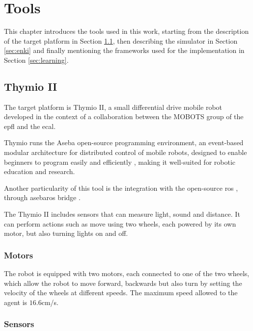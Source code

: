 \chapter{Tools}
\label{chap:impl}

This chapter introduces the tools used in this work, starting from the description 
of the target platform in Section \ref{sec:thymio}, then describing the simulator 
in Section \ref{sec:enki} and finally mentioning the frameworks used for the 
implementation in Section \ref{sec:learning}.

\section{Thymio II}
\label{sec:thymio}

The target platform is Thymio II, a small differential drive mobile robot developed 
in the context of a collaboration between the MOBOTS group of the \gls{epfl} and 
the \gls{ecal}. 

Thymio runs the Aseba open-source programming environment, an event-based 
modular architecture for distributed control of mobile robots, designed to enable 
beginners to program easily and efficiently \cite[][]{magnenat2010aseba, 
mondada2017bringing}, making it well-suited for robotic education and research.

Another particularity of this tool is the integration with the open-source 
\gls{ros} \cite[][]{quigley2009ros}, through asebaros bridge 
\cite[][]{asebaros}. 

The Thymio II includes sensors that can measure light, sound and distance. 
It can perform actions such as move using two wheels, each powered by its own 
motor, but also turning lights on and off.

\subsection{Motors}
\label{subsection:thymotors}
The robot is equipped with two motors, each connected to one of the two 
wheels, which allow the robot to move forward, backwards but also turn by 
setting the velocity of the wheels at different speeds. The maximum speed 
allowed 
to the agent is $16.6$\gls{cm/s}.

\subsection{Sensors}
\label{subsec:thysensors}

